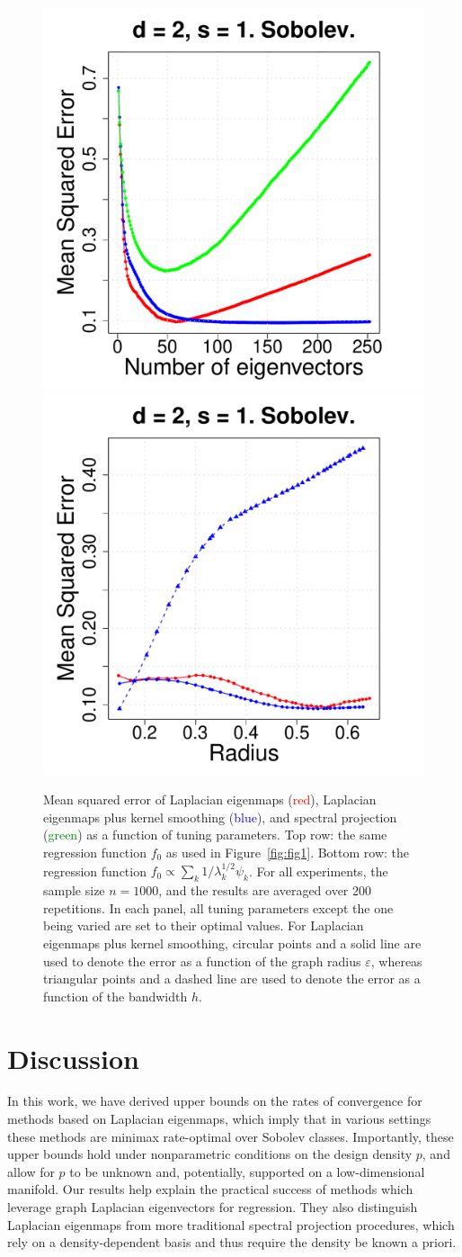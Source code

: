 \documentclass[aos]{imsart}
\theoremstyle{plain}
\theoremstyle{definition}
\theoremstyle{remark}
\newcommand{\1}{\mathbf{1}}
\begin{document}
\begin{figure}[tb]
	\includegraphics[width=.245\textwidth]{../figures/tuning/sobolev/mse_by_number_of_eigenvectors_2d_1s.pdf}
	\includegraphics[width=.245\textwidth]{../figures/tuning/sobolev/mse_by_radius_2d_1s.pdf}  
	\caption{Mean squared error of Laplacian eigenmaps (\textcolor{red}{red}), Laplacian eigenmaps plus kernel smoothing (\textcolor{blue}{blue}), and spectral projection (\textcolor{green}{green}) as a function of tuning parameters. Top row: the same regression function $f_0$ as used in Figure~\ref{fig:fig1}. Bottom row: the regression function $f_0 \propto \sum_{k} 1/\lambda_k^{1/2} \psi_k$. For all experiments, the sample size $n = 1000$, and the results are averaged over $200$ repetitions. In each panel, all tuning parameters except the one being varied are set to their optimal values. For Laplacian eigenmaps plus kernel smoothing, circular points and a solid line are used to denote the error as a function of the graph radius $\varepsilon$, whereas triangular points and a dashed line are used to denote the error as a function of the bandwidth $h$.}
	\label{fig:fig3}
\end{figure}

\section{Discussion}
\label{sec:discussion}

In this work, we have derived upper bounds on the rates of convergence for methods based on Laplacian eigenmaps, which imply that in various settings these methods are minimax rate-optimal over Sobolev classes. Importantly, these upper bounds hold under nonparametric conditions on the design density $p$, and allow for $p$ to be unknown and, potentially, supported on a low-dimensional manifold. Our results help explain the practical success of methods which leverage graph Laplacian eigenvectors for regression. They also distinguish Laplacian eigenmaps from more traditional spectral projection procedures, which rely on a density-dependent basis and thus require the density be known a priori.
\end{document}
